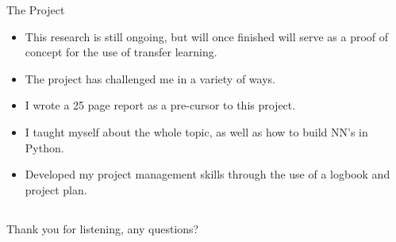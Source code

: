 \documentclass{beamer}
\begin{document}
\begin{frame}{The Project}
    \begin{alertblock}{}
    \begin{itemize}
        \item This research is still ongoing, but will once finished will serve as a proof of concept for the use of transfer learning.
        \item The project has challenged me in a variety of ways.
        \item I wrote a 25 page report as a pre-cursor to this project.
        \item I taught myself about the whole topic, as well as how to build NN's in Python.
        \item Developed my project management skills through the use of a logbook and project plan.
    \end{itemize}
    \end{alertblock}
\end{frame}



\subsection{}
\begin{frame}{}
    \begin{center}
        Thank you for listening, any questions?
    \end{center}
\end{frame}




\end{document}
